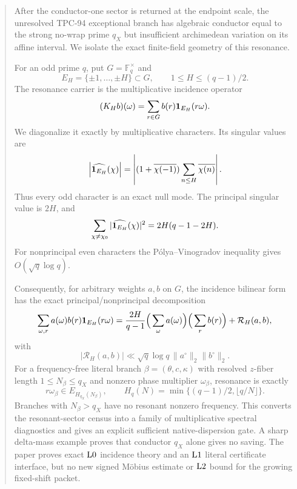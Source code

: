\begin{abstract}
After the conductor-one sector is returned at the endpoint scale,
the unresolved TPC-94 exceptional branch has algebraic conductor
equal to the strong no-wrap prime \(q_X\) but insufficient
archimedean variation on its affine interval.  We isolate the exact
finite-field geometry of this resonance.

For an odd prime \(q\), put \(G=\mathbb F_q^\times\) and
\[
 E_H=\{\pm1,\ldots,\pm H\}\subset G,
 \qquad 1\le H\le(q-1)/2.
\]
The resonance carrier is the multiplicative incidence operator
\[
 (K_Hb)(\omega)
 =\sum_{r\in G}b(r)\one_{E_H}(r\omega).
\]
We diagonalize it exactly by multiplicative characters.  Its
singular values are
\[
 \left|\widehat{\one_{E_H}}(\chi)\right|
 =
 \left|
 (1+\overline{\chi(-1)})
 \sum_{n\le H}\overline{\chi(n)}
 \right|.
\]
Thus every odd character is an exact null mode.  The principal
singular value is \(2H\), and
\[
 \sum_{\chi\ne\chi_0}
 |\widehat{\one_{E_H}}(\chi)|^2
 =2H(q-1-2H).
\]
For nonprincipal even characters the P\'olya--Vinogradov inequality
gives \(O(\sqrt q\log q)\).

Consequently, for arbitrary weights \(a,b\) on \(G\), the incidence
bilinear form has the exact principal/nonprincipal decomposition
\[
 \sum_{\omega,r}a(\omega)b(r)\one_{E_H}(r\omega)
 =
 \frac{2H}{q-1}\Big(\sum_\omega a(\omega)\Big)
 \Big(\sum_r b(r)\Big)
 +\mathcal R_H(a,b),
\]
with
\[
 |\mathcal R_H(a,b)|
 \ll\sqrt q\log q\,
 \|a^\circ\|_2\|b^\circ\|_2.
\]
For a frequency-free literal branch \(\beta=(\theta,c,\kappa)\)
with resolved \(z\)-fiber length \(1\le N_\beta\le q_X\) and
nonzero phase multiplier \(\omega_\beta\), resonance is exactly
\[
 r\omega_\beta\in E_{H_{q_X}(N_\beta)},\qquad
 H_q(N)=\min\{(q-1)/2,\lfloor q/N\rfloor\}.
\]
Branches with \(N_\beta>q_X\) have no resonant nonzero frequency.
This converts the resonant-sector census into a family of
multiplicative spectral diagnostics and gives an explicit sufficient
native-dispersion gate.  A sharp delta-mass example proves that
conductor \(q_X\) alone gives no saving.  The paper proves exact
\(\Lzero\) incidence theory and an \(\Lone\) literal certificate
interface, but no new signed M\"obius estimate or \(\Ltwo\) bound for
the growing fixed-shift packet.
\end{abstract}
